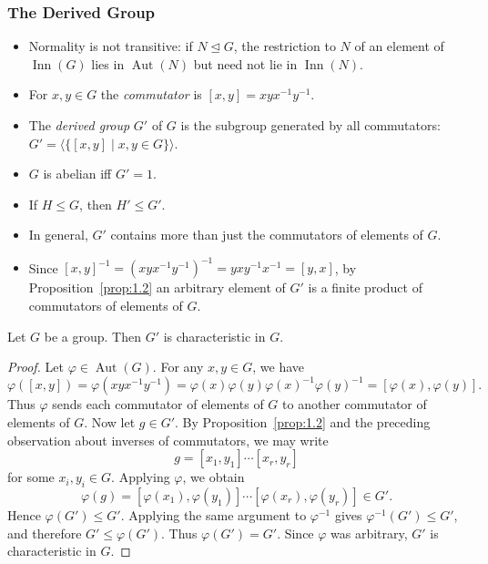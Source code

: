 \documentclass[../Odyssey_Project.tex]{subfiles}
\begin{document}
\subsubsection*{The Derived Group}
\begin{itemize}
    \item Normality is not transitive: if $N \trianglelefteq G$, the restriction to $N$ of an element of $\operatorname{Inn}(G)$ lies in $\operatorname{Aut}(N)$ but need not lie in $\operatorname{Inn}(N)$.
    \item For $x,y \in G$ the \emph{commutator} is $[x,y] = xyx^{-1}y^{-1}$.
    \item The \emph{derived group} $G'$ of $G$ is the subgroup generated by all commutators: $G' = \langle \{[x,y] \mid x,y \in G\} \rangle$.
    \item $G$ is abelian iff $G' = 1$.
    \item If $H \leq G$, then $H' \leq G'$.
    \item In general, $G'$ contains more than just the commutators of elements of $G$.
    \item Since $[x,y]^{-1} = (xyx^{-1}y^{-1})^{-1} = yxy^{-1}x^{-1} = [y,x]$, by Proposition~\ref{prop:1.2} an arbitrary element of $G'$ is a finite product of commutators of elements of $G$.
\end{itemize}

\begin{lemma}
\label{lem:2.5}
Let $G$ be a group. Then $G'$ is characteristic in $G$.
\end{lemma}
\begin{proof}
    Let $\varphi \in \operatorname{Aut}(G)$. For any $x,y \in G$, we have
    \[
        \varphi([x,y])
        = \varphi(xyx^{-1}y^{-1})
        = \varphi(x)\varphi(y)\varphi(x)^{-1}\varphi(y)^{-1}
        = [\varphi(x),\varphi(y)].
    \]
    Thus $\varphi$ sends each commutator of elements of $G$ to another commutator of elements of $G$. Now let $g \in G'$. By Proposition~\ref{prop:1.2} and the preceding observation about inverses of commutators, we may write
    \[
        g = [x_1,y_1]\cdots [x_r,y_r]
    \]
    for some $x_i,y_i \in G$. Applying $\varphi$, we obtain
    \[
        \varphi(g)
        = [\varphi(x_1),\varphi(y_1)]\cdots [\varphi(x_r),\varphi(y_r)] \in G'.
    \]
    Hence $\varphi(G') \leq G'$. Applying the same argument to $\varphi^{-1}$ gives $\varphi^{-1}(G') \leq G'$, and therefore $G' \leq \varphi(G')$. Thus $\varphi(G') = G'$. Since $\varphi$ was arbitrary, $G'$ is characteristic in $G$.
\end{proof}
\end{document}
